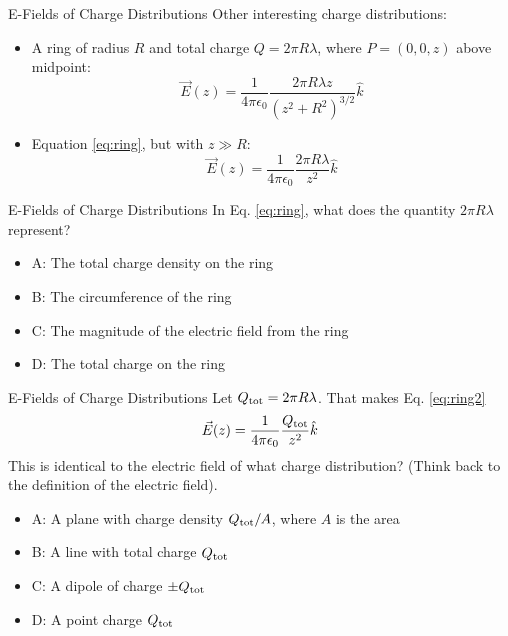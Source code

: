 \documentclass{beamer}
\begin{document}
\begin{frame}{E-Fields of Charge Distributions}
Other interesting charge distributions:
\begin{itemize}
\item A ring of radius $R$ and total charge $Q = 2\pi R\lambda$, where $P = (0,0,z)$ above midpoint:
\begin{equation}
\vec{E}(z) = \frac{1}{4\pi\epsilon_0} \frac{2\pi R \lambda z}{\left(z^2 + R^2\right)^{3/2}} \hat{k} \label{eq:ring}
\end{equation}
\item Equation \ref{eq:ring}, but with $z \gg R$:
\begin{equation}
\vec{E}(z) = \frac{1}{4\pi\epsilon_0} \frac{2\pi R \lambda }{z^2} \hat{k} \label{eq:ring2}
\end{equation}
\end{itemize}
\end{frame}

\begin{frame}{E-Fields of Charge Distributions}
In Eq. \ref{eq:ring}, what does the quantity $2\pi R\lambda$ represent?
\begin{itemize}
\item A: The total charge density on the ring
\item B: The circumference of the ring
\item C: The magnitude of the electric field from the ring
\item D: The total charge on the ring
\end{itemize}
\end{frame}

\begin{frame}{E-Fields of Charge Distributions}
Let $Q_{\rm tot} = 2\pi R \lambda$.  That makes Eq. \ref{eq:ring2}
\begin{equation}
\vec{E}(z) = \frac{1}{4\pi\epsilon_0} \frac{Q_{\rm tot}}{z^2} \hat{k}
\end{equation}
This is identical to the electric field of what charge distribution?  (Think back to the definition of the electric field).
\begin{itemize}
\item A: A plane with charge density $Q_{\rm tot}/A$, where $A$ is the area
\item B: A line with total charge $Q_{\rm tot}$
\item C: A dipole of charge $\pm Q_{\rm tot}$
\item D: A point charge $Q_{\rm tot}$
\end{itemize}
\end{frame}
\end{document}
